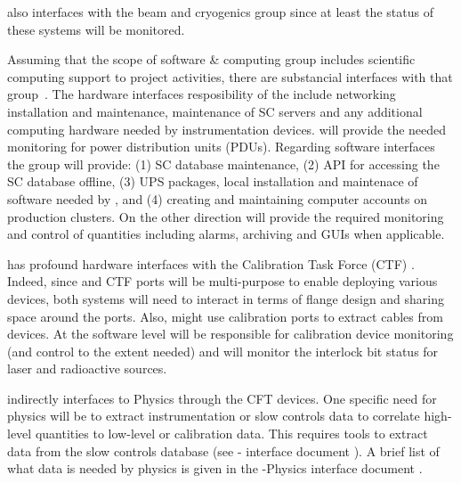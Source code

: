 
 also interfaces with the beam and cryogenics group since at least the status of these systems will be monitored.



Assuming that the scope of software \& computing  group includes scientific computing support to project activities, there are substancial interfaces with that group~\cite{bib:docdb7126}. 
The hardware interfaces resposibility of the  include networking installation and maintenance,
maintenance of SC servers 
and any additional computing hardware needed by instrumentation devices.
 will provide the needed monitoring for power distribution units (PDUs). Regarding software interfaces the  group will provide:
(1) SC database maintenance, (2) API for accessing the SC database offline,
(3) UPS packages, local installation and maintenace of software needed by , and (4)  creating and maintaining computer accounts on production clusters. 
On the other direction  will provide the required monitoring and control of  quantities including alarms, archiving and GUIs when applicable. 


 has profound hardware interfaces with the Calibration Task Force (CTF) \cite{bib:docdb7072}. Indeed, since  and CTF ports will be multi-purpose to enable deploying various devices,
both systems will need to interact in terms of flange design and sharing space around the ports. Also,  might use calibration ports to extract cables from  devices. 
At the software level  will be responsible for calibration device monitoring (and control to the extent needed) and will 
monitor the interlock bit status for laser and radioactive sources. 

 indirectly interfaces to Physics through the CFT devices. One specific need for physics will be to extract
instrumentation or slow controls data to correlate high-level quantities to low-level or calibration data.
This requires tools to extract data from the slow controls database (see - interface document \cite{bib:docdb7126}).
A brief list of what  data is needed by physics is given in the -Physics interface document \cite{bib:docdb7099}. 


